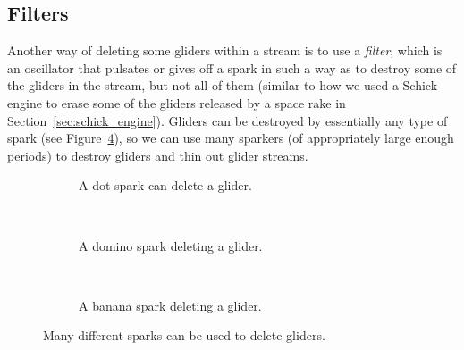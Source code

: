 \subsection{Filters}\label{sec:filters}

Another way of deleting some gliders within a stream is to use a \emph{filter}, which is an oscillator that pulsates or gives off a spark in such a way as to destroy some of the gliders in the stream, but not all of them (similar to how we used a Schick engine to erase some of the gliders released by a space rake in Section~\ref{sec:schick_engine}). Gliders can be destroyed by essentially any type of spark (see Figure~\ref{fig:glider_delete_spark}), so we can use many sparkers (of appropriately large enough periods) to destroy gliders and thin out glider streams.

\begin{figure}[!htb]
	\centering
	\begin{subfigure}{.31\textwidth}
		\centering
		\caption{A dot spark can delete a glider.}
		\label{fig:glider_delete_dot}
	\end{subfigure} \ \ \ \ %
	\begin{subfigure}{.31\textwidth}
		\centering
		\caption{A domino spark deleting a glider.}
		\label{fig:glider_delete_domino}
	\end{subfigure} \ \ \ \ %
	\begin{subfigure}{.31\textwidth}
		\centering
		\caption{A banana spark deleting a glider.}
		\label{fig:glider_delete_banana}
	\end{subfigure}
	\caption{Many different sparks can be used to delete gliders.}\label{fig:glider_delete_spark}
\end{figure}

